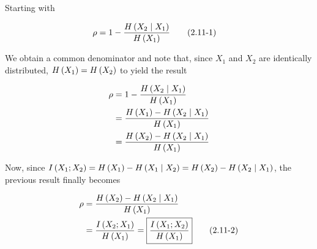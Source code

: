\documentclass[ClusteringConnectionsMAIN.tex]{subfiles}
\begin{document}
	

  Starting with

\begin{align} \label{c2p11eq1}
\rho &= 1 - \frac{ H \left( X_2 \mid X_1 \right) }{ H \left( X_1 \right) }  \tag{2.11-1}
\end{align}

We obtain a common denominator and note that, since $X_1$ and $X_2$ are identically distributed, $H \left( X_1 \right) = H \left( X_2 \right)$ to yield the result

\begin{align} 
\rho &= 1 - \frac{ H \left( X_2 \mid X_1 \right) }{ H \left( X_1 \right) }   \notag \\
&= \frac{ H \left( X_1 \right) - H \left( X_2 \mid X_1 \right) }{ H \left( X_1 \right) }  \notag \\
&= \frac{ H \left( X_2 \right) - H \left( X_2 \mid X_1 \right) }{ H \left( X_1 \right) }  \notag
\end{align}

Now, since $I \left( X_1; X_2 \right) = H \left( X_1 \right) - H \left( X_1 \mid X_2 \right) = H \left( X_2 \right) - H \left( X_2 \mid X_1 \right)$, the previous result finally becomes

\begin{align} \label{c2p11eq2}
\rho &= \frac{ H \left( X_2 \right) - H \left( X_2 \mid X_1 \right) }{ H \left( X_1 \right) }  \notag \\
&= \frac{ I \left( X_2; X_1  \right) }{ H \left( X_1 \right) } = \boxed{ \frac{ I \left( X_1; X_2 \right) }{ H \left( X_1 \right) } }   \tag{2.11-2}
\end{align}
\end{document}
